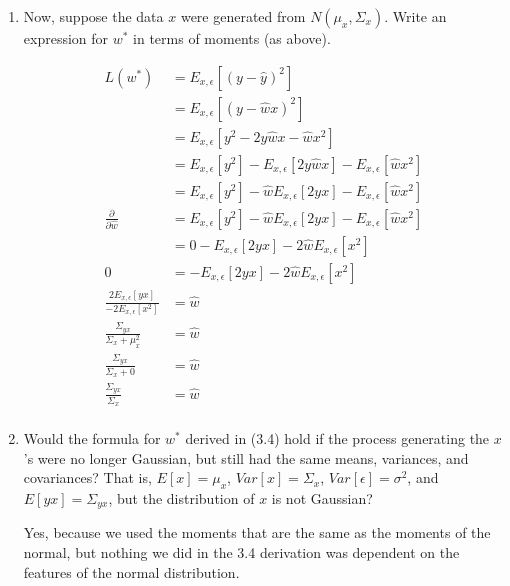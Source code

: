 \documentclass[submit]{harvardml}
\begin{document}
\begin{enumerate}
\item Now, suppose the data $x$ were generated from
  $N(\mu_x,\Sigma_x)$.  Write an expression for $w^*$ in terms of
  moments (as above).  
  
\begin{equation}
    \begin{split}
        L(w^*) &= E_{x, \epsilon} [(y - \hat{y})^2] \\
        &= E_{x, \epsilon} [(y - \hat{w} x)^2] \\
        &= E_{x, \epsilon}[y^2 - 2y\hat{w}x - \hat{w}x^2]\\
        &= E_{x, \epsilon}[y^2] - E_{x, \epsilon}[2y\hat{w}x] -E_{x, \epsilon}[\hat{w}x^2]\\
        &= E_{x, \epsilon}[y^2] - \hat{w} E_{x, \epsilon}[2yx] -E_{x, \epsilon}[\hat{w}x^2]\\
        \frac{\partial}{\partial \hat{w}}&= E_{x, \epsilon}[y^2] - \hat{w} E_{x, \epsilon}[2yx] -E_{x, \epsilon}[\hat{w}x^2] \\
        &= 0 - E_{x, \epsilon}[2yx] - 2\hat{w} E_{x, \epsilon}[x^2]\\
        0 &= - E_{x, \epsilon}[2yx] - 2\hat{w} E_{x, \epsilon}[x^2]\\
        \frac{2E_{x,\epsilon}[yx]}{-2E_{x,\epsilon}[x^2]} &= \hat{w}\\
        \frac{\Sigma_{yx}}{\Sigma_{x}
        +\mu_x^2} &= \hat{w}\\
        \frac{\Sigma_{yx}}{\Sigma_{x}+0}
        &= \hat{w}\\
        \frac{\Sigma_{yx}}{\Sigma_{x}}
         &= \hat{w}\\
    \end{split}
\end{equation}

  
\item Would the formula for $w^*$ derived in (3.4) hold if the process generating the $x$'s
  were no longer Gaussian, but still had the same means, variances, and covariances?
  That is, $E[x]=\mu_x$, $Var[x]=\Sigma_x$, $Var[\epsilon] = \sigma^2$, and $E[yx] = \Sigma_{y x}$, but the distribution of $x$
  is not Gaussian?  

 Yes, because we used the moments that are the same as the moments of the normal, but nothing we did in the 3.4 derivation was dependent on the features of the normal distribution.
  
\end{enumerate}
\end{document}
